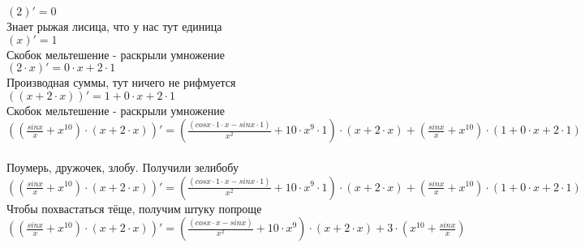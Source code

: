 \documentclass[a4paper,12pt]{article}
\begin{document}
\begin{math}
	(2)' = 0
\end{math}\\
Знает рыжая лисица, что у нас тут единица\\
\begin{math}
	(x)' = 1
\end{math}\\
Скобок мельтешение - раскрыли умножение\\
\begin{math}
	(2 \cdot x)' = 0 \cdot x + 2 \cdot 1
\end{math}\\
Производная суммы, тут ничего не рифмуется\\
\begin{math}
	((x + 2 \cdot x))' = 1 + 0 \cdot x + 2 \cdot 1
\end{math}\\
Скобок мельтешение - раскрыли умножение\\
\begin{math}
	(( \frac{ sin x }{x}  + x ^{10} ) \cdot (x + 2 \cdot x))' = ( \frac{( cos x  \cdot 1 \cdot x -  sin x  \cdot 1)}{x ^{2} }  + 10 \cdot x ^{9}  \cdot 1) \cdot (x + 2 \cdot x) + ( \frac{ sin x }{x}  + x ^{10} ) \cdot (1 + 0 \cdot x + 2 \cdot 1)
\end{math}\\
\\Поумерь, дружочек, злобу. Получили зелибобу\\ $(( \frac{ sin x }{x}  + x ^{10} ) \cdot (x + 2 \cdot x))' = ( \frac{( cos x  \cdot 1 \cdot x -  sin x  \cdot 1)}{x ^{2} }  + 10 \cdot x ^{9}  \cdot 1) \cdot (x + 2 \cdot x) + ( \frac{ sin x }{x}  + x ^{10} ) \cdot (1 + 0 \cdot x + 2 \cdot 1)$\\
Чтобы похвастаться тёще, получим штуку попроще\\
$(( \frac{ sin x }{x}  + x ^{10} ) \cdot (x + 2 \cdot x))' = ( \frac{( cos x  \cdot x -  sin x )}{x ^{2} }  + 10 \cdot x ^{9} ) \cdot (x + 2 \cdot x) + 3 \cdot (x ^{10}  +  \frac{ sin x }{x} )$\\
\end{document}
